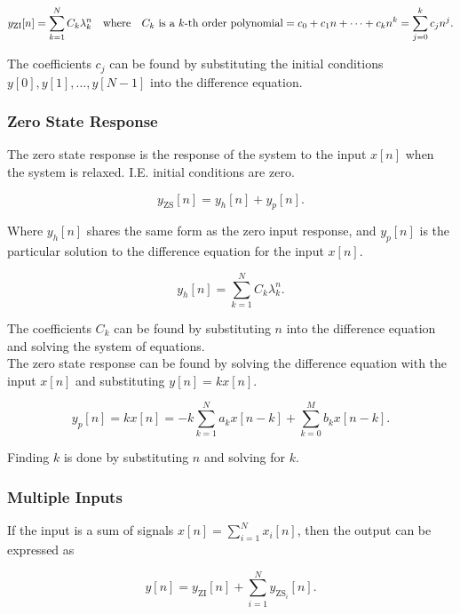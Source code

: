 \documentclass{report}
\begin{document}
\[
	y_\text{ZI}[n] = \sum_{k=1}^{N} C_k \lambda_k^n \qq{where} C_k \text{ is a $k$-th order polynomial} = c_0 + c_1n + \cdots + c_k n^k = \sum_{j=0}^{k} c_jn^j
	.\]

The coefficients $c_j$ can be found by substituting the initial conditions $y[0], y[1], \ldots, y[N-1]$ into the difference equation.

\subsubsection{Zero State Response}

The zero state response is the response of the system to the input $x[n]$ when the system is relaxed. I.E. initial conditions are zero.

\[
	y_\text{ZS}[n] = y_h[n] + y_p[n]
	.\]

Where $y_h[n]$ shares the same form as the zero input response, and $y_p[n]$ is the particular solution to the difference equation for the input $x[n]$.

\[
	y_h[n] = \sum_{k=1}^{N} C_k \lambda_k^n
	.\]

The coefficients $C_k$ can be found by substituting $n$ into the difference equation and solving the system of equations.\\

The zero state response can be found by solving the difference equation with the input $x[n]$ and substituting $y[n] = kx[n]$.

\[
	y_p[n] = kx[n] = -k \sum_{k=1}^{N} a_k x[n-k] + \sum_{k=0}^{M} b_k x[n-k]
	.\]

Finding $k$ is done by substituting $n$ and solving for $k$.

\subsubsection{Multiple Inputs}

If the input is a sum of signals $x[n] = \sum_{i=1}^{N} x_i[n]$, then the output can be expressed as

\[
	y[n] = y_\text{ZI}[n] + \sum_{i=1}^{N} y_{\text{ZS}_i}[n]
	.\]
\end{document}

